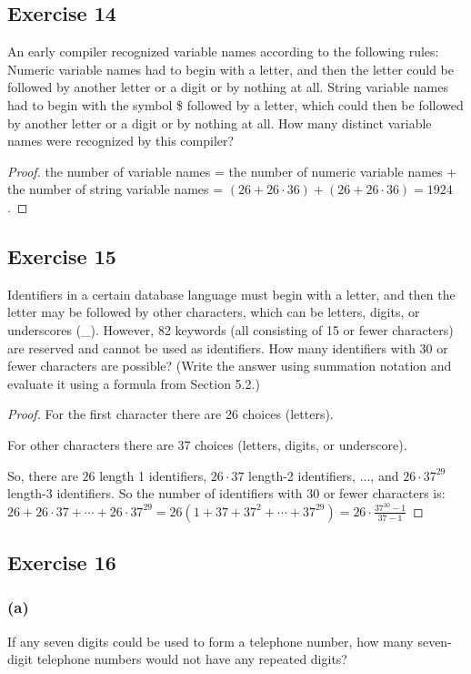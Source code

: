 \documentclass[14pt]{extarticle}
\begin{document}
\subsection{Exercise 14}
An early compiler recognized variable names according to the following rules: Numeric variable names had to begin with a
letter, and then the letter could be followed by another letter or a digit or by nothing at all. String variable names
had to begin with the symbol \$ followed by a letter, which could then be followed by another letter or a digit or by
nothing at all. How many distinct variable names were recognized by this compiler?

\begin{proof}
     the number of variable names = the number of numeric variable names + the number of string variable names =
     \((26 + 26 \cdot 36) + (26 + 26 \cdot 36) = 1924\).
\end{proof}

\subsection{Exercise 15}
Identifiers in a certain database language must begin with a letter, and then the letter may be followed by other
characters, which can be letters, digits, or underscores (\_). However, 82 keywords (all consisting of 15 or fewer
characters) are reserved and cannot be used as identifiers. How many identifiers with 30 or fewer characters are
possible? (Write the answer using summation notation and evaluate it using a formula from Section 5.2.)

\begin{proof}
     For the first character there are 26 choices (letters).

     For other characters there are 37 choices (letters, digits, or underscore).

     So, there are \(26\) length 1 identifiers, \(26 \cdot 37\) length-2 identifiers, ..., and \(26 \cdot 37^{29}\)
     length-3 identifiers. So the number of identifiers with 30 or fewer characters is: \\
     \(26+26 \cdot 37 + \cdots + 26 \cdot 37^{29} = 26(1+37+37^2+\cdots+37^{29}) = 26 \cdot \frac{37^{30}-1}{37-1}\)
\end{proof}

\subsection{Exercise 16}
\subsubsection{(a)}
If any seven digits could be used to form a telephone number, how many seven-digit telephone numbers would not
have any repeated digits?
\end{document}

